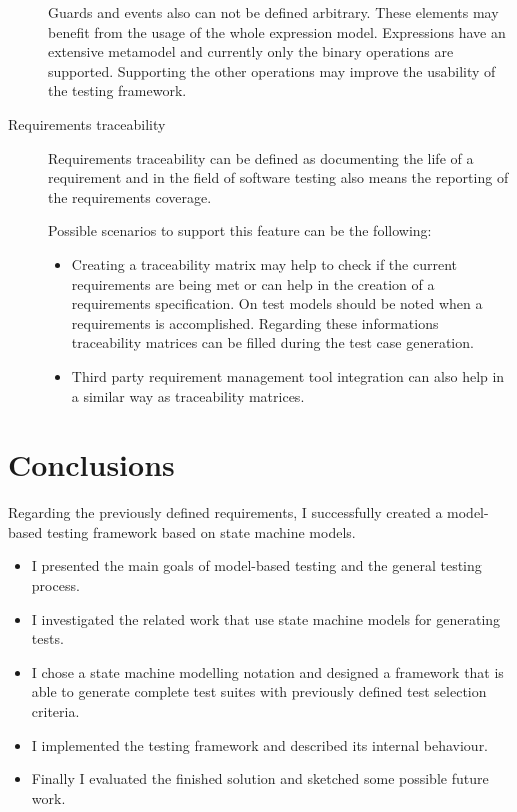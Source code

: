\begin{description}
	Guards and events also can not be defined arbitrary. These elements may benefit from the usage of the whole expression model. Expressions have an extensive metamodel and currently only the binary operations are supported. Supporting the other operations may improve the usability of the testing framework.
	\item[Requirements traceability] Requirements traceability can be defined as documenting the life of a requirement and in the field of software testing also means the reporting of the requirements coverage.
	
	Possible scenarios to support this feature can be the following:
	
	\begin{itemize}
		\item Creating a traceability matrix may help to check if the current requirements are being met or can help in the creation of a requirements specification. On test models should be noted when a requirements is accomplished. Regarding these informations traceability matrices can be filled during the test case generation.
		\item Third party requirement management tool integration can also help in a similar way as traceability matrices.
	\end{itemize}
\end{description}


\section{Conclusions}
\label{sec:conclusions}

Regarding the previously defined requirements, I successfully created a model-based testing framework based on state machine models.

\begin{itemize}
	\item I presented the main goals of model-based testing and the general testing process.
	\item I investigated the related work that use state machine models for generating tests.
	\item I chose a state machine modelling notation and designed a framework that is able to generate complete test suites with previously defined test selection criteria.
	\item I implemented the testing framework and described its internal behaviour.
	\item Finally I evaluated the finished solution and sketched some possible future work.
\end{itemize}

